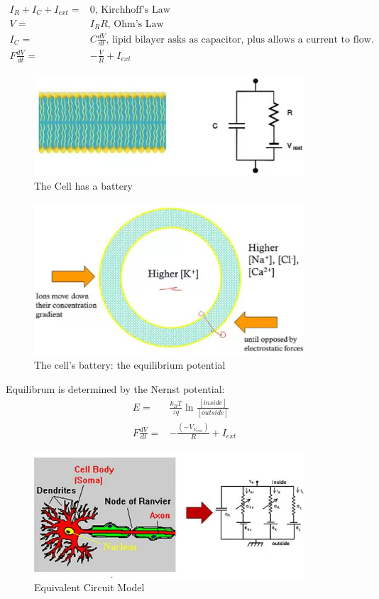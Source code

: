 \documentclass[]{article}
\begin{document}
\begin{align*}
	I_R + I_C + I_{ext} =& 0 \text{, Kirchhoff's Law}\\
	V =& I_R R \text{, Ohm's Law}\\
	I_C =& C \frac{dV}{dt} \text{, lipid bilayer asks as capacitor, plus allows a current to flow.}\\
	F\frac{dV}{dt} =& -\frac{V}{R} + I_{ext}
\end{align*}
\begin{figure}[H]
	\caption[The Cell has a battery]{The Cell has a battery}
	\includegraphics[width=0.9\textwidth]{cell-has-battery}
\end{figure}

\begin{figure}[H]
	\caption[The cell's battery: the equilibrium potential]{The cell's battery: the equilibrium potential}
	\includegraphics[width=0.9\textwidth]{equilibrium-potential}
\end{figure}

Equilibrum is determined by the Nernst potential:
\begin{align*}
	E =& \frac{k_B T}{zq}\ln \frac{[inside]}{[outside]} \\
	F\frac{dV}{dt} =& -\frac{(-V_V_{rest})}{R} + I_{ext}
	
\end{align*}

\begin{figure}[H]
	\caption[Equivalent Circuit Model]{Equivalent Circuit Model}
	\includegraphics[width=0.9\textwidth]{equivalent-circuit-model}
\end{figure}
\end{document}
